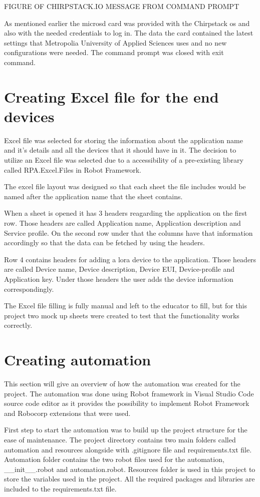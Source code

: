 FIGURE OF CHIRPSTACK.IO MESSAGE FROM COMMAND PROMPT

As mentioned earlier the micro\gls{sd} card was provided with the Chirpstack \gls{os} and also with the needed credentials to log in.
The data the card contained the latest settings that Metropolia University of Applied Sciences uses and no new configurations were needed.
The command prompt was closed with exit command.

\section{Creating Excel file for the end devices}
Excel file was selected for storing the information about the application name and it's details and all the devices that it should have in it.
The decision to utilize an Excel file was selected due to a accessibility of a pre-existing library called RPA.Excel.Files in Robot Framework.

The excel file layout was designed so that each sheet the file includes would be named after the application name that the sheet contains.

When a sheet is opened it has 3 headers reagarding the application on the first row.
Those headers are called Application name, Application description and Service profile.
On the second row under that the columns have that information accordingly so that the data can be fetched by using the headers.

Row 4 contains headers for adding a \gls{lora} device to the application.
Those headers are called Device name, Device description, Device EUI, Device-profile and Application key.
Under those headers the user adds the device information correspondingly.

The Excel file filling is fully manual and left to the educator to fill, but for this project two mock up sheets were created to test that the functionality works correctly.

\section{Creating automation}
This section will give an overview of how the automation was created for the project.
The automation was done using Robot framework in Visual Studio Code source code editor as it provides the possibility to implement Robot Framework and Robocorp extensions that were used.

First step to start the automation was to build up the project structure for the ease of maintenance.
The project directory contains two main folders called automation and resources alongside with .gitignore file and requirements.txt file.
Automation folder contains the two robot files used for the automation, \_\_init\_\_.robot and automation.robot.
Resources folder is used in this project to store the variables used in the project.
All the required packages and libraries are included to the requirements.txt file.

